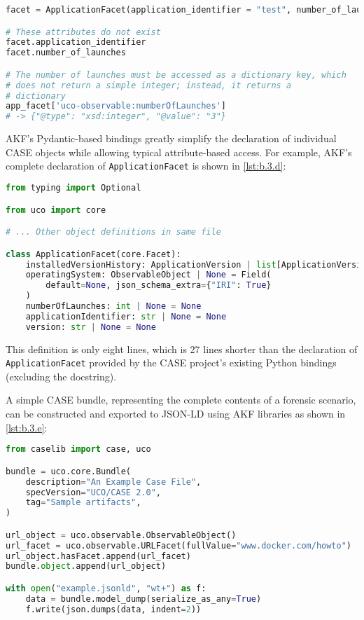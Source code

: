 \begin{lstlisting}[label={lst:b.3.c}, caption={Sample usage of official CASE Python bindings \cite{CaseworkCASEMappingPython}}, language=Python]
facet = ApplicationFacet(application_identifier = "test", number_of_launches=3)

# These attributes do not exist
facet.application_identifier
facet.number_of_launches

# The number of launches must be accessed as a dictionary key, which
# does not return a simple integer; instead, it returns a
# dictionary
app_facet['uco-observable:numberOfLaunches']
# -> {"@type": "xsd:integer", "@value": "3"}
\end{lstlisting}

AKF's Pydantic-based bindings greatly simplify the declaration of
individual CASE objects while allowing typical attribute-based access.
For example, AKF's complete declaration of
\passthrough{\lstinline!ApplicationFacet!} is shown in
\autoref{lst:b.3.d}:

\begin{lstlisting}[label={lst:b.3.d}, caption={Example of Pydantic-based CASE object declaration used by AKF}, language=Python]
from typing import Optional

from uco import core

# ... Other object definitions in same file

class ApplicationFacet(core.Facet):
    installedVersionHistory: ApplicationVersion | list[ApplicationVersion] | None = []
    operatingSystem: ObservableObject | None = Field(
        default=None, json_schema_extra={"IRI": True}
    )
    numberOfLaunches: int | None = None
    applicationIdentifier: str | None = None
    version: str | None = None
\end{lstlisting}

This definition is only eight lines, which is 27 lines shorter than the
declaration of \passthrough{\lstinline!ApplicationFacet!} provided by
the CASE project's existing Python bindings (excluding the docstring).

A simple CASE bundle, representing the complete contents of a forensic
scenario, can be constructed and exported to JSON-LD using AKF libraries
as shown in \autoref{lst:b.3.e}:

\begin{lstlisting}[label={lst:b.3.e}, caption={Demonstration of bundle serialization using the AKF Python bindings for CASE}, language=Python]
from caselib import case, uco

bundle = uco.core.Bundle(
    description="An Example Case File",
    specVersion="UCO/CASE 2.0",
    tag="Sample artifacts",
)

url_object = uco.observable.ObservableObject()
url_facet = uco.observable.URLFacet(fullValue="www.docker.com/howto")
url_object.hasFacet.append(url_facet)
bundle.object.append(url_object)

with open("example.jsonld", "wt+") as f:
    data = bundle.model_dump(serialize_as_any=True)
    f.write(json.dumps(data, indent=2))
\end{lstlisting}

